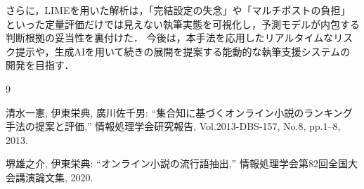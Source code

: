 \documentclass[twocolumn,10pt,a4paper]{jsarticle}
\begin{document}
さらに，LIMEを用いた解析は，「完結設定の失念」や「マルチポストの負担」といった定量評価だけでは見えない執筆実態を可視化し，予測モデルが内包する判断根拠の妥当性を裏付けた．
今後は，本手法を応用したリアルタイムなリスク提示や，生成AIを用いて続きの展開を提案する能動的な執筆支援システムの開発を目指す．


\begin{thebibliography}{9}

  清水一憲, 伊東栄典, 廣川佐千男: ``集合知に基づくオンライン小説のランキング手法の提案と評価,'' 情報処理学会研究報告, Vol.2013-DBS-157, No.8, pp.1--8, 2013.

  堺雄之介, 伊東栄典: ``オンライン小説の流行語抽出,'' 情報処理学会第82回全国大会講演論文集, 2020.

\end{thebibliography}
\end{document}

